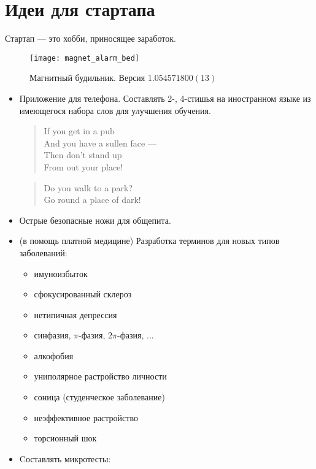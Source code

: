 \section{Идеи для стартапа}
Стартап --- это хобби, приносящее заработок.

\begin{figure}[ht!]
    \centering
    \texttt{[image: magnet\_alarm\_bed]}
    \caption{Магнитный будильник. Версия \( 1.054571800(13) \)}
\end{figure}

\begin{itemize}
\item Приложение для телефона. Составлять 2-, 4-стишья на иностранном языке из имеющегося набора слов для улучшения обучения.
\begin{flushleft}
\begin{verse}
If you get in a pub\\
And you have a sullen face ---\\
Then don't stand up\\
From out your place!
\end{verse}

\begin{verse}
Do you walk to a park?\\
Go round a place of dark!
\end{verse}
\end{flushleft}
\item Острые безопасные ножи для общепита.

\item (в помощь платной медицине) Разработка терминов для новых типов заболеваний:
    \begin{itemize}
        \item имуноизбыток
        \item сфокусированный склероз
        \item нетипичная депрессия
        \item синфазия, $\pi$-фазия, $2\pi$-фазия, ...
        \item алкофобия
        \item униполярное растройство личности
        \item соница (студенческое заболевание)
        \item неэффективное растройство
        \item торсионный шок
    \end{itemize}
\item Cоставлять микротесты:



\end{itemize}

